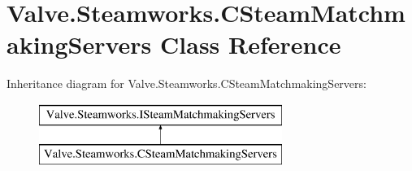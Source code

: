 \hypertarget{classValve_1_1Steamworks_1_1CSteamMatchmakingServers}{}\section{Valve.\+Steamworks.\+C\+Steam\+Matchmaking\+Servers Class Reference}
\label{classValve_1_1Steamworks_1_1CSteamMatchmakingServers}
Inheritance diagram for Valve.\+Steamworks.\+C\+Steam\+Matchmaking\+Servers\+:\begin{figure}[H]
\begin{center}
\leavevmode
\includegraphics[height=2.000000cm]{classValve_1_1Steamworks_1_1CSteamMatchmakingServers}
\end{center}
\end{figure}
